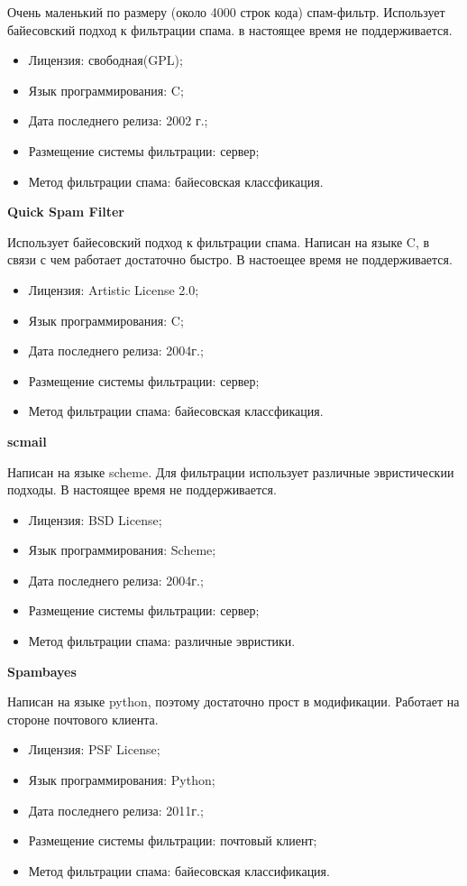 Очень маленький по размеру (около 4000 строк кода) спам-фильтр. Использует байесовский подход к фильтрации спама. в настоящее время не поддерживается.
\begin{itemize}
\item Лицензия: свободная(GPL); 
\item Язык программирования: C;
\item Дата последнего релиза: 2002 г.;
\item Размещение системы фильтрации: сервер;
\item Метод фильтрации спама: байесовская классфикация.
\end{itemize}

\textbf{Quick Spam Filter}

Использует байесовский подход к фильтрации спама. Написан на языке C, в связи с чем работает достаточно быстро. В настоещее время не поддерживается.
\begin{itemize}
\item Лицензия: Artistic License 2.0;
\item Язык программирования: C;
\item Дата последнего релиза: 2004г.;
\item Размещение системы фильтрации: сервер;
\item Метод фильтрации спама: байесовская классфикация.
\end{itemize}

\textbf{scmail}

Написан на языке scheme. Для фильтрации использует различные эвристическии подходы. В настоящее время не поддерживается.
\begin{itemize}
\item Лицензия: BSD License;
\item Язык программирования: Scheme;
\item Дата последнего релиза: 2004г.;
\item Размещение системы фильтрации: сервер;
\item Метод фильтрации спама: различные эвристики.
\end{itemize}

\textbf{Spambayes}

Написан на языке python, поэтому достаточно прост в модификации. Работает на стороне почтового клиента.

\begin{itemize}
\item Лицензия: PSF License;
\item Язык программирования: Python;
\item Дата последнего релиза: 2011г.;
\item Размещение системы фильтрации: почтовый клиент;
\item Метод фильтрации спама: байесовская классификация.
\end{itemize}




